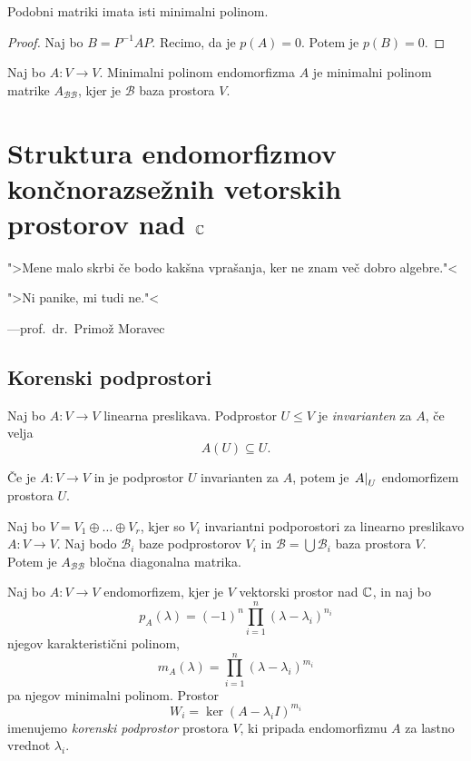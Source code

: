 \documentclass[12pt, a4paper]{article}
\begin{document}
\begin{trditev}
Podobni matriki imata isti minimalni polinom.
\end{trditev}

\begin{proof}
Naj bo $B=P^{-1}AP$. Recimo, da je $p(A)=0$. Potem je $p(B)=0$.
\end{proof}

\begin{definicija}
Naj bo $A\colon V\to V$. Minimalni polinom endomorfizma $A$ je minimalni polinom matrike $A_{\mathcal{BB}}$, kjer je $\mathcal{B}$ baza prostora $V$.
\end{definicija}

\newpage

\section{Struktura endomorfizmov končnorazsežnih vetorskih prostorov nad $\mathbb{C}$}

\epigraph{">Mene malo skrbi če bodo kakšna vprašanja, ker ne znam več dobro algebre."<

">Ni panike, mi tudi ne."<}{---prof.~dr.~Primož Moravec}

\subsection{Korenski podprostori}

\begin{definicija}
Naj bo $A\colon V\to V$ linearna preslikava. Podprostor $U\leq V$ je \emph{invarianten} za $A$, če velja
\[
A(U)\subseteq U.
\]
\end{definicija}

\begin{opomba}
Če je $A\colon V\to V$ in je podprostor $U$ invarianten za $A$, potem je $\left. A\right|_{U}^{}$ endomorfizem prostora $U$.
\end{opomba}

\begin{trditev}
Naj bo $V=V_1\oplus\dots\oplus V_r$, kjer so $V_i$ invariantni podporostori za linearno preslikavo $A\colon V\to V$. Naj bodo $\mathcal{B}_i$ baze podprostorov $V_i$ in $\mathcal{B}=\bigcup\mathcal{B}_i$ baza prostora $V$. Potem je $A_{\mathcal{BB}}$ bločna diagonalna matrika.
\end{trditev}

\obvs

\begin{definicija}
Naj bo $A\colon V\to V$ endomorfizem, kjer je $V$ vektorski prostor nad $\mathbb{C}$, in naj bo
\[
p_A(\lambda)=(-1)^n\prod_{i=1}^n(\lambda-\lambda_i)^{n_i}
\]
njegov karakteristični polinom,
\[
m_A(\lambda)=\prod_{i=1}^n(\lambda-\lambda_i)^{m_i}
\]
pa njegov minimalni polinom. Prostor
\[
W_i=\ker(A-\lambda_i I)^{m_i}
\]
imenujemo \emph{korenski podprostor} prostora $V$, ki pripada endomorfizmu $A$ za lastno vrednot $\lambda_i$.
\end{definicija}
\end{document}
